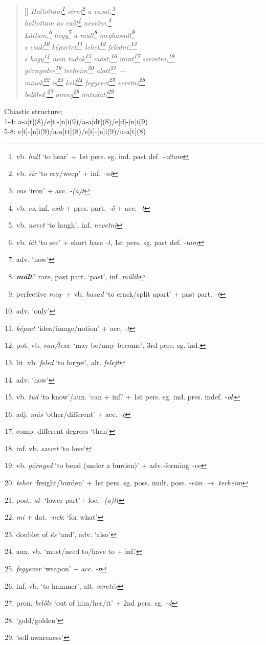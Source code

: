 \documentclass[a4paper,12pt,twoside,final]{book}
\begin{document}
\begin{verse}[\versewidth]
  \it
  Hallottam\footnote{vb. \emph{hall} `to hear' + 1st
  pers. sg. ind. past def. \emph{-ottam}} sírni\footnote{vb.
  \emph{sír} `to cry/weep' + inf. \emph{-ni}} a
  vasat,\footnote{\emph{vas} `iron' + acc. \emph{-(a)t}} \\
  hallottam az esőt\footnote{vb. \emph{es}, inf. \emph{esik} +
  pres. part. \emph{-ő} + acc. \emph{-t}} nevetni.\footnote{vb.
  \emph{nevet} `to laugh', inf. \emph{nevetni}} \\
  Láttam,\footnote{vb. \emph{lát} `to see' +
  short base \emph{-t}, 1st pers. sg. past def. \emph{-tam}}
  hogy\footnote{adv. `how'} a mult\footnote{\textbf{\emph{múlt}}?
  rare, past part. `past', inf. \emph{múlik}}
  meghasadt\footnote{perfective \emph{meg-} + vb.
  \emph{hasad} `to crack/split apart' + past
  part. \emph{-t}} \\
  s csak\footnote{adv. `only'} képzetet\footnote{\emph{képzet}
  `idea/image/notion' + acc. \emph{-t}}
  lehet\footnote{pot. vb. \emph{van/lesz}:
  `may be/may become', 3rd pers. sg. ind.}
  feledni;\footnote{lit. vb. \emph{feled} `to forget', alt. \emph{felejt}} \\
  s hogy\footnote{adv. `how'} nem tudok\footnote{vb.
  \emph{tud} `to know'/aux. `can + inf.' + 1st
  pers. sg. ind. pres. indef. \emph{-ok}}
  mást,\footnote{adj. \emph{más} `other/different' + acc. \emph{-t}}
  mint\footnote{comp. different degrees `than'}
  szeretni,\footnote{inf. vb. \emph{szeret} `to love'} \\
  görnyedve\footnote{vb. \emph{görnyed} `to bend (under a
  burden)' + adv.-forming \emph{-ve}} terheim\footnote{\emph{teher}
  `freight/burden' + 1st
  pers. sg. poss. mult. poss. \emph{-eim} $\rightarrow$ \emph{terheim}}
  alatt\footnote{post. \emph{al-} `lower part'+ loc. \emph{-(a)tt}}
  --- \\
  minek\footnote{\emph{mi} + dat. \emph{-nek}: `for what'}
  is\footnote{doublet of \emph{és} `and', adv. `also'}
  kell\footnote{aux. vb. `must/need to/have to + inf.'}
  fegyvert\footnote{\emph{fegyever} `weapon' + acc. \emph{-t}}
    veretni\footnote{inf. vb. `to hammer', alt. \emph{veretés}} \\
  belőled,\footnote{pron. \emph{belőle} `out of him/her/it' + 2nd
  pers. sg. \emph{-d}} arany\footnote{`gold/golden'}
  öntudat!\footnote{`self-awareness'} \\
\end{verse}

\noindent Chiastic structure: \\
1-4: a-a[t](8)/e[t]-[n]i(9)/a-a[dt](8)/e[d]-[n]i(9) \\
5-8: e[t]-[n]i(9)/a-a[tt](8)/e[t]-[n]i(9)/u-a[t](8)
\end{document}
